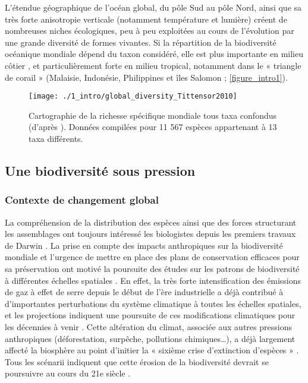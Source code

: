 L’étendue géographique de l’océan global, du pôle Sud au pôle Nord, ainsi que sa très forte anisotropie verticale (notamment température et lumière) créent de nombreuses niches écologiques, peu à peu exploitées au cours de l’évolution par une grande diversité de formes vivantes. Si la répartition de la biodiversité océanique mondiale dépend du taxon considéré, elle est plus importante en milieu côtier \citep{tittensor_global_2010}, et particulièrement forte en milieu tropical, notamment dans le « triangle de corail » \citep{sanciangco_habitat_2013} (Malaisie, Indonésie, Philippines et îles Salomon ; \autoref{figure_intro1}).

\begin{figure}[H]
	\begin{center}
	\texttt{[image: ./1\_intro/global\_diversity\_Tittensor2010]}
		\caption[Cartographie de la richesse spécifique mondiale tous taxa confondus]{Cartographie de la richesse spécifique mondiale tous taxa confondus (d'après \citet{tittensor_global_2010}). Données compilées pour 11 567 espèces appartenant à 13 taxa différents.}
	\label{figure_intro1}
\end{center}
\end{figure}

\subsection{Une biodiversité sous pression}\label{intro.1.2}

\subsubsection{Contexte de changement global}\label{intro.1.2.1}
La compréhension de la distribution des espèces ainsi que des forces structurant les assemblages ont toujours intéressé les biologistes depuis les premiers travaux de Darwin \citep{darwin_origin_1859}. La prise en compte des impacts anthropiques sur la biodiversité mondiale et l’urgence de mettre en place des plans de conservation efficaces pour sa préservation \citep{margules_systematic_2000} ont motivé la poursuite des études sur les patrons de biodiversité à différentes échelles spatiales \citep{rosa_multiscale_2017}. En effet, la très forte intensification des émissions de gaz à effet de serre depuis le début de l’ère industrielle a déjà contribué à d’importantes perturbations du système climatique à toutes les échelles spatiales, et les projections indiquent une poursuite de ces modifications climatiques pour les décennies à venir \citep{ipcc_climate_2013}. Cette altération du climat, associée aux autres pressions anthropiques (déforestation, surpêche, pollutions chimiques…), a déjà largement affecté la biosphère au point d’initier la « sixième crise d’extinction d’espèces » \citep{barnosky_has_2011, dirzo_defaunation_2014, ceballos_accelerated_2015}. Tous les scénarii indiquent que cette érosion de la biodiversité devrait se poursuivre au cours du 21e siècle \citep{pereira_scenarios_2010, tittensor_mid-term_2014, visconti_projecting_2016}.

